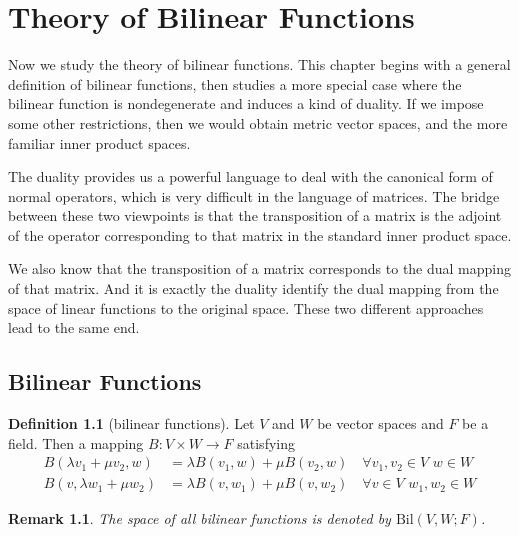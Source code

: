 \documentclass{book}
\newtheorem*{remark}{Remark}
\theoremstyle{definition}
\newtheorem{definition}{Definition}[section]
\begin{document}
\chapter{Theory of Bilinear Functions}
Now we study the theory of bilinear functions. This chapter begins with a general definition of bilinear functions, then studies a more special case where the bilinear function is nondegenerate and induces a kind of duality. If we impose some other restrictions, then we would obtain metric vector spaces, and the more familiar inner product spaces.\par
The duality provides us a powerful language to deal with the canonical form of normal operators, which is very difficult in the language of matrices. The bridge between these two viewpoints is that the transposition of a matrix is the adjoint of the operator corresponding to that matrix in the standard inner product space.\par
We also know that the transposition of a matrix corresponds to the dual mapping of that matrix. And it is exactly the duality identify the dual mapping from the space of linear functions to the original space. These two different approaches lead to the same end.
\section{Bilinear Functions}
\begin{definition}[bilinear functions]
Let $V$ and $W$ be vector spaces and $F$ be a field. Then a mapping $B:V\times W\to F$ satisfying 
\begin{align*}
B(\lambda v_1+\mu v_2,w)&=\lambda B(v_1,w)+\mu B(v_2,w)\quad \forall v_1,v_2\in V\,\,w\in W\\
B(v,\lambda w_1+\mu w_2)&=\lambda B(v,w_1)+\mu B(v,w_2)\quad \forall v\in V\,\,w_1,w_2\in W
\end{align*}
\end{definition}
\begin{remark}
The space of all bilinear functions is denoted by $\text{Bil}(V,W;F)$.
\end{remark}
\end{document}
